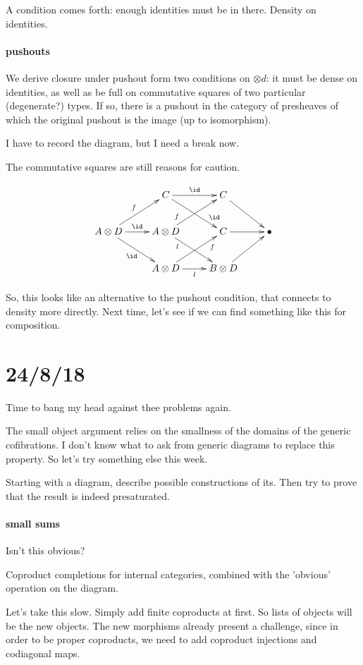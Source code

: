 \documentclass[csh.tex]{subfiles}
\begin{document}
A condition comes forth: enough identities must be in there. Density on identities. 

\paragraph{pushouts}
We derive closure under pushout form two conditions on $\otimes d$: it must be dense on identities, as well as be full on commutative squares of two particular (degenerate?) types. If so, there is a pushout in the category of presheaves of which the original pushout is the image (up to isomorphism). 

I have to record the diagram, but I need a break now.

The commutative squares are still reasons for caution.

\[\xymatrix{
& C \ar[r]^\id \ar[dr]^(.75)\id & C \ar[dr]\\
A\otimes D \ar[ur]^f\ar[dr]_\id\ar[r]^\id & A\otimes D\ar[ur]^(.25)f\ar[dr]_(.25)l & C\ar[r] & \bullet \\
& A\otimes D \ar[r]_l\ar[ur]_(.75)f & B\otimes D\ar[ur]
}\]

So, this looks like an alternative to the pushout condition, that connects to density more directly. 
Next time, let's see if we can find something like this for composition.


\section{24/8/18}
Time to bang my head against thee problems again.

The small object argument relies on the smallness of the domains of the generic cofibrations. I don't know what to ask from generic diagrams to replace this property. So let's try something else this week.

Starting with a diagram, describe possible constructions of its. Then try to prove that the result is indeed presaturated.

\paragraph{small sums}
Isn't this obvious?

Coproduct completions for internal categories, combined with the 'obvious' operation on the diagram.

Let's take this slow. Simply add finite coproducts at first. So lists of objects will be the new objects. The new morphisms already present a challenge, since in order to be proper coproducts, we need to add coproduct injections and codiagonal maps.
\end{document}
